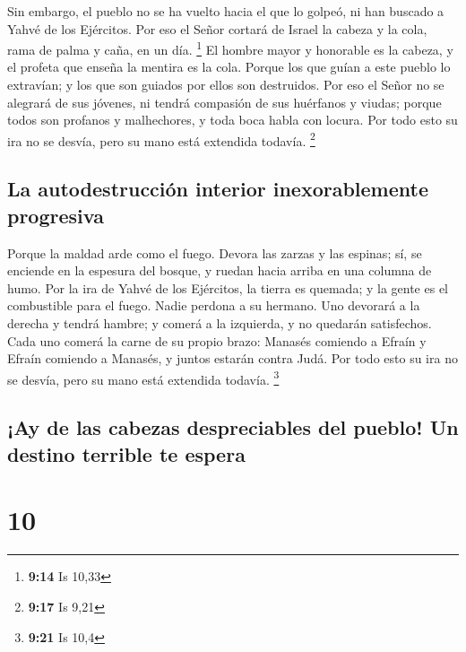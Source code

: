  Sin embargo, el pueblo no se ha vuelto hacia el que lo
golpeó, ni han buscado a Yahvé de los Ejércitos.  Por eso
el Señor cortará de Israel la cabeza y la cola, rama de palma y caña, en
un día. \footnote{\textbf{9:14} Is 10,33}  El hombre
mayor y honorable es la cabeza, y el profeta que enseña la mentira es la
cola.  Porque los que guían a este pueblo lo extravían; y
los que son guiados por ellos son destruidos.  Por eso el
Señor no se alegrará de sus jóvenes, ni tendrá compasión de sus
huérfanos y viudas; porque todos son profanos y malhechores, y toda boca
habla con locura. Por todo esto su ira no se desvía, pero su mano está
extendida todavía. \footnote{\textbf{9:17} Is 9,21}

\hypertarget{la-autodestrucciuxf3n-interior-inexorablemente-progresiva}{%
\subsection{La autodestrucción interior inexorablemente
progresiva}\label{la-autodestrucciuxf3n-interior-inexorablemente-progresiva}}

 Porque la maldad arde como el fuego. Devora las zarzas y
las espinas; sí, se enciende en la espesura del bosque, y ruedan hacia
arriba en una columna de humo.  Por la ira de Yahvé de
los Ejércitos, la tierra es quemada; y la gente es el combustible para
el fuego. Nadie perdona a su hermano.  Uno devorará a la
derecha y tendrá hambre; y comerá a la izquierda, y no quedarán
satisfechos. Cada uno comerá la carne de su propio brazo:
 Manasés comiendo a Efraín y Efraín comiendo a Manasés, y
juntos estarán contra Judá. Por todo esto su ira no se desvía, pero su
mano está extendida todavía. \footnote{\textbf{9:21} Is 10,4}

\hypertarget{ay-de-las-cabezas-despreciables-del-pueblo-un-destino-terrible-te-espera}{%
\subsection{¡Ay de las cabezas despreciables del pueblo! Un destino
terrible te
espera}\label{ay-de-las-cabezas-despreciables-del-pueblo-un-destino-terrible-te-espera}}

\hypertarget{section-9}{%
\section{10}\label{section-9}}

